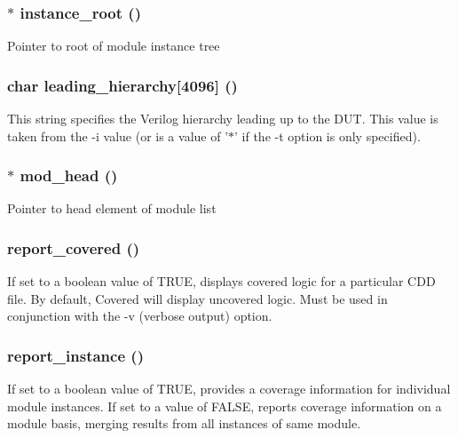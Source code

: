 \subsubsection{$\ast$ {\bf instance\_\-root} ()}\label{toggle_8c_a0}


Pointer to root of module instance tree 
\subsubsection{\setlength{\rightskip}{0pt plus 5cm}char {\bf leading\_\-hierarchy}[4096] ()}\label{toggle_8c_a4}


This string specifies the Verilog hierarchy leading up to the DUT. This value is taken from the -i value (or is a value of '$\ast$' if the -t option is only specified). 
\subsubsection{$\ast$ {\bf mod\_\-head} ()}\label{toggle_8c_a1}


Pointer to head element of module list 
\subsubsection{ {\bf report\_\-covered} ()}\label{toggle_8c_a2}


If set to a boolean value of TRUE, displays covered logic for a particular CDD file. By default, Covered will display uncovered logic. Must be used in conjunction with the -v (verbose output) option. 
\subsubsection{ {\bf report\_\-instance} ()}\label{toggle_8c_a3}


If set to a boolean value of TRUE, provides a coverage information for individual module instances. If set to a value of FALSE, reports coverage information on a module basis, merging results from all instances of same module. 